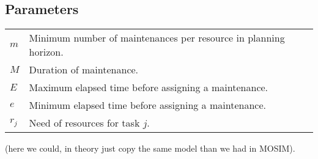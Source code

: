 \documentclass[a4paper,11pt]{article}
\begin{document}
    \subsection{Parameters}

    \begin{tabular}{ll}
        $m$ & Minimum number of maintenances per resource in planning horizon. \\
        $M$ & Duration of maintenance. \\
        $E$ & Maximum elapsed time before assigning a maintenance. \\
        $e$ & Minimum elapsed time before assigning a maintenance. \\
        $r_{j}$ & Need of resources for task $j$. \\
    \end{tabular}

    (here we could, in theory just copy the same model than we had in MOSIM).

    \vskip 0.3cm




\end{document}
